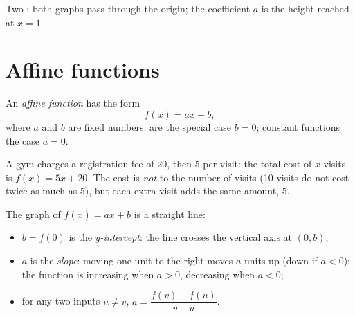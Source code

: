 \begin{omfigure}

{\small Two : both graphs pass through the origin; the
coefficient $a$ is the height reached at $x = 1$.}
\end{omfigure}

\section{Affine functions}

\begin{definition}\label{def:g9:linfunc:affine}
An \emph{affine function} has the form
\[
f(x) = a x + b ,
\]
where $a$ and $b$ are fixed numbers.  are the special
case $b = 0$; constant functions the case $a = 0$.
\end{definition}

\begin{example}
A gym charges a registration fee of $20$, then $5$ per visit: the total
cost of $x$ visits is $f(x) = 5x + 20$. The cost is \emph{not}
 to the number of visits (10 visits do not cost twice as much
as 5), but each extra visit adds the same amount, $5$.
\end{example}

\begin{proposition}\label{prop:g9:linfunc:affinegraph}
The graph of $f(x) = ax + b$ is a straight line:
\begin{itemize}
  \item $b = f(0)$ is the \emph{$y$-intercept}: the line crosses the
        vertical axis at $(0, b)$;
  \item $a$ is the \emph{slope}: moving one unit to the
        right moves $a$ units up (down if $a < 0$); the function is
        increasing when $a > 0$, decreasing when $a < 0$;
  \item for any two inputs $u \neq v$,
        $a = \dfrac{f(v) - f(u)}{v - u}$.
\end{itemize}
\end{proposition}

